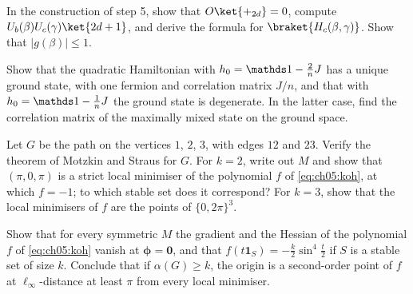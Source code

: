\documentclass[handoutsbeamer.tex]{subfiles}
\begin{document}
\begin{frame}
\onp{\footnotesize}
\begin{exe}\label{exe:ch05:qaoa}
In the construction of step 5, show that $O\ket{+_{2d}} = 0$, compute $U_b(\beta)U_c(\gamma)\ket{2d+1}$, and derive the formula for $\braket{H_c(\beta,\gamma)}$. Show that $|g(\beta)|\le1$.
\end{exe}
\begin{exe}
Show that the quadratic Hamiltonian with $h_0 = \one - \frac2nJ$ has a unique ground state, with one fermion and correlation matrix $J/n$, and that with $h_0 = \one - \frac1nJ$ the ground state is degenerate. In the latter case, find the correlation matrix of the maximally mixed state on the ground space.
\end{exe}
\end{frame}

\begin{frame}
\onp{\footnotesize}
\begin{exe}\label{exe:ch05:path}
Let $G$ be the path on the vertices $1$, $2$, $3$, with edges $12$ and $23$. Verify the theorem of Motzkin and Straus for $G$. For $k = 2$, write out $M$ and show that $(\pi,0,\pi)$ is a strict local minimiser of the polynomial $f$ of \eqref{eq:ch05:koh}, at which $f = -1$; to which stable set does it correspond? For $k = 3$, show that the local minimisers of $f$ are the points of $\{0,2\pi\}^3$.
\end{exe}
\begin{exe}\label{exe:ch05:secondorder}
Show that for every symmetric $M$ the gradient and the Hessian of the polynomial $f$ of \eqref{eq:ch05:koh} vanish at $\boldsymbol\phi = \boldsymbol0$, and that $f(t\boldsymbol1_S) = -\frac k2\sin^4\frac t2$ if $S$ is a stable set of size $k$. Conclude that if $\alpha(G)\ge k$, the origin is a second-order point of $f$ at $\ell_\infty$-distance at least $\pi$ from every local minimiser.
\end{exe}
\end{frame}
\end{document}
